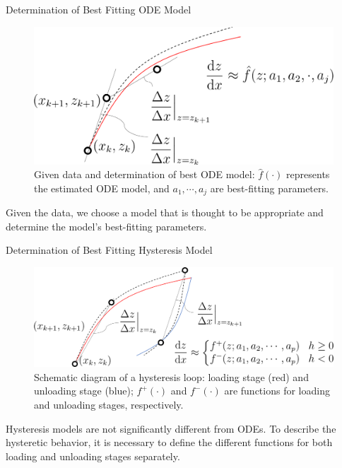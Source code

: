 \documentclass[9pt]{beamer}
\newcounter{frame}[frame]
\begin{document}
\begin{frame}{Determination of Best Fitting ODE Model}
\begin{figure}
	\includegraphics[height=.4\textheight]{ODEfigure2}
	\caption{Given data and determination of best ODE model: $\hat f(\cdot)$ represents the estimated ODE model, and $a_1,\cdots,a_j$ are best-fitting parameters.}
\end{figure}
Given the data, we choose a model that is thought to be appropriate and determine the model's best-fitting parameters.
\end{frame}

\begin{frame}{Determination of Best Fitting Hysteresis Model}
\begin{figure}
	\includegraphics[height=.4\textheight]{ODEfigure3}
	\caption{Schematic diagram of a hysteresis loop: loading stage (red) and unloading stage (blue); $f^+(\cdot)$ and $f^-(\cdot)$ are functions for loading and unloading stages, respectively.}
\end{figure}
Hysteresis models are not significantly different from ODEs. To describe the hysteretic behavior, it is necessary to define the different functions for both loading and unloading stages separately.
\end{frame}
\end{document}
